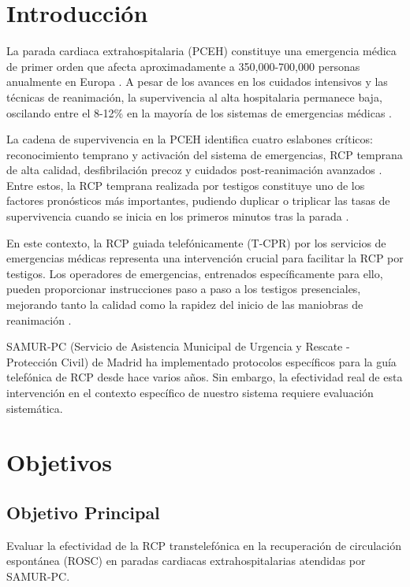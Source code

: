 \documentclass[10pt,a4paper]{article}
\begin{document}
\begin{multicols}{2}

\section{Introducción}

La parada cardiaca extrahospitalaria (PCEH) constituye una emergencia médica de primer orden que afecta aproximadamente a 350,000-700,000 personas anualmente en Europa \cite{ref1}. A pesar de los avances en los cuidados intensivos y las técnicas de reanimación, la supervivencia al alta hospitalaria permanece baja, oscilando entre el 8-12\% en la mayoría de los sistemas de emergencias médicas \cite{ref2}.

La cadena de supervivencia en la PCEH identifica cuatro eslabones críticos: reconocimiento temprano y activación del sistema de emergencias, RCP temprana de alta calidad, desfibrilación precoz y cuidados post-reanimación avanzados \cite{ref3}. Entre estos, la RCP temprana realizada por testigos constituye uno de los factores pronósticos más importantes, pudiendo duplicar o triplicar las tasas de supervivencia cuando se inicia en los primeros minutos tras la parada \cite{ref4}.

En este contexto, la RCP guiada telefónicamente (T-CPR) por los servicios de emergencias médicas representa una intervención crucial para facilitar la RCP por testigos. Los operadores de emergencias, entrenados específicamente para ello, pueden proporcionar instrucciones paso a paso a los testigos presenciales, mejorando tanto la calidad como la rapidez del inicio de las maniobras de reanimación \cite{ref5}.

SAMUR-PC (Servicio de Asistencia Municipal de Urgencia y Rescate - Protección Civil) de Madrid ha implementado protocolos específicos para la guía telefónica de RCP desde hace varios años. Sin embargo, la efectividad real de esta intervención en el contexto específico de nuestro sistema requiere evaluación sistemática.

\section{Objetivos}

\subsection{Objetivo Principal}
Evaluar la efectividad de la RCP transtelefónica en la recuperación de circulación espontánea (ROSC) en paradas cardiacas extrahospitalarias atendidas por SAMUR-PC.


\end{multicols}
\end{document}
